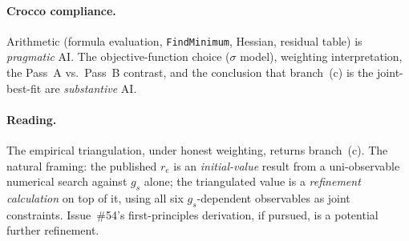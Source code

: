 \paragraph{Crocco compliance.}
Arithmetic (formula evaluation, \texttt{FindMinimum}, Hessian, residual table)
is \emph{pragmatic} AI. The objective-function choice ($\sigma$ model),
weighting interpretation, the Pass~A vs.~Pass~B contrast, and the conclusion
that branch~(c) is the joint-best-fit are \emph{substantive} AI.

\paragraph{Reading.}
The empirical triangulation, under honest weighting, returns branch~(c). The
natural framing: the published $r_e$ is an \emph{initial-value} result from a
uni-observable numerical search against $g_s$ alone; the triangulated value is
a \emph{refinement calculation} on top of it, using all six $g_s$-dependent
observables as joint constraints. Issue~\#54's first-principles derivation, if
pursued, is a potential further refinement.

